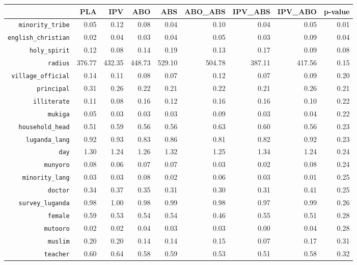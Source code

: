 \begin{longtable}{rrrrrrrrr}
  \hline
 & PLA & IPV & ABO & ABS & ABO\_ABS & IPV\_ABS & IPV\_ABO & p-value \\ 
  \hline
{\texttt{minority\_tribe}} & 0.05 & 0.12 & 0.08 & 0.04 & 0.10 & 0.04 & 0.05 & 0.01 \\ 
  {\texttt{english\_christian}} & 0.02 & 0.04 & 0.03 & 0.04 & 0.05 & 0.03 & 0.09 & 0.04 \\ 
  {\texttt{holy\_spirit}} & 0.12 & 0.08 & 0.14 & 0.19 & 0.13 & 0.17 & 0.09 & 0.08 \\ 
  {\texttt{radius}} & 376.77 & 432.35 & 448.73 & 529.10 & 504.78 & 387.11 & 417.56 & 0.15 \\ 
  {\texttt{village\_official}} & 0.14 & 0.11 & 0.08 & 0.07 & 0.12 & 0.07 & 0.09 & 0.20 \\ 
  {\texttt{principal}} & 0.31 & 0.26 & 0.22 & 0.21 & 0.22 & 0.21 & 0.26 & 0.21 \\ 
  {\texttt{illiterate}} & 0.11 & 0.08 & 0.16 & 0.12 & 0.16 & 0.16 & 0.10 & 0.22 \\ 
  {\texttt{mukiga}} & 0.05 & 0.03 & 0.03 & 0.03 & 0.09 & 0.03 & 0.04 & 0.22 \\ 
  {\texttt{household\_head}} & 0.51 & 0.59 & 0.56 & 0.56 & 0.63 & 0.60 & 0.56 & 0.23 \\ 
  {\texttt{luganda\_lang}} & 0.92 & 0.93 & 0.83 & 0.86 & 0.81 & 0.82 & 0.92 & 0.23 \\ 
  {\texttt{day}} & 1.30 & 1.24 & 1.26 & 1.32 & 1.25 & 1.34 & 1.24 & 0.24 \\ 
  {\texttt{munyoro}} & 0.08 & 0.06 & 0.07 & 0.07 & 0.03 & 0.02 & 0.08 & 0.24 \\ 
  {\texttt{minority\_lang}} & 0.03 & 0.03 & 0.08 & 0.02 & 0.06 & 0.03 & 0.01 & 0.25 \\ 
  {\texttt{doctor}} & 0.34 & 0.37 & 0.35 & 0.31 & 0.30 & 0.31 & 0.41 & 0.25 \\ 
  {\texttt{survey\_luganda}} & 0.98 & 1.00 & 0.98 & 0.99 & 0.98 & 0.97 & 0.99 & 0.26 \\ 
  {\texttt{female}} & 0.59 & 0.53 & 0.54 & 0.54 & 0.46 & 0.55 & 0.51 & 0.28 \\ 
  {\texttt{mutooro}} & 0.02 & 0.02 & 0.04 & 0.03 & 0.03 & 0.00 & 0.04 & 0.28 \\ 
  {\texttt{muslim}} & 0.20 & 0.20 & 0.14 & 0.14 & 0.15 & 0.07 & 0.17 & 0.31 \\ 
  {\texttt{teacher}} & 0.60 & 0.64 & 0.58 & 0.59 & 0.53 & 0.51 & 0.58 & 0.32 \\ 

\end{longtable}

